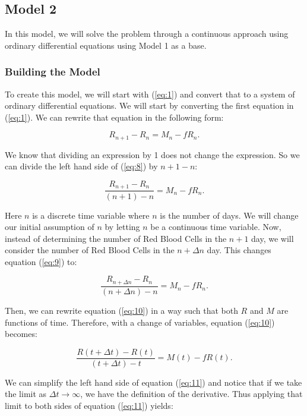 \subsection{Model 2}

In this model, we will solve the problem through a continuous approach using ordinary differential equations using Model 1 as a base.

\subsubsection{Building the Model}

To create this model, we will start with (\ref{eq:1}) and convert that to a system of ordinary differential equations. We will start by converting the first equation in (\ref{eq:1}). We can rewrite that equation in the following form:

\begin{equation} \label{eq:8}
    R_{n+1} - R_n = M_n - fR_n.
\end{equation}

We know that dividing an expression by 1 does not change the expression. So we can divide the left hand side of (\ref{eq:8}) by $n+1-n$:

\begin{equation} \label{eq:9}
    \frac{R_{n+1} - R_n}{(n+1)-n} = M_n - fR_n.
\end{equation}

Here $n$ is a discrete time variable where $n$ is the number of days. We will change our initial assumption of $n$ by letting $n$ be a continuous time variable. Now, instead of determining the number of Red Blood Cells in the $n+1$ day, we will consider the number of Red Blood Cells in the $n+\Delta n$ day. This changes equation (\ref{eq:9}) to:

\begin{equation} \label{eq:10}
    \frac{R_{n+\Delta n} - R_n}{(n+\Delta n)-n} = M_n - fR_n.
\end{equation}

Then, we can rewrite equation (\ref{eq:10}) in a way such that both $R$ and $M$ are functions of time. Therefore, with a change of variables, equation (\ref{eq:10}) becomes:

\begin{equation} \label{eq:11}
    \frac{R(t+\Delta t) - R(t)}{(t+\Delta t)-t} = M(t) - fR(t).
\end{equation}

We can simplify the left hand side of equation (\ref{eq:11}) and notice that if we take the limit as $\Delta t\to\infty$, we have the definition of the derivative. Thus applying that limit to both sides of equation (\ref{eq:11}) yields:

